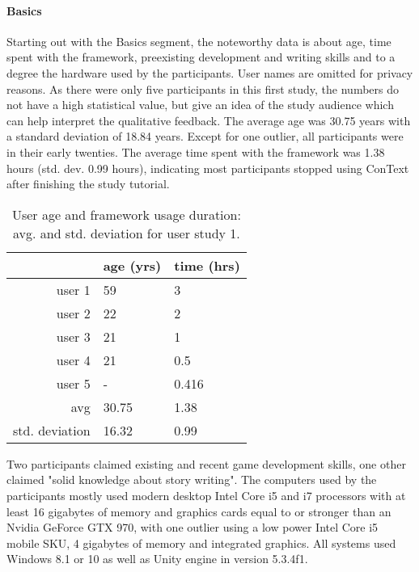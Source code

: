 \paragraph{Basics} 
Starting out with the Basics segment, the noteworthy data is about age, time spent with the framework, preexisting development and writing skills and to a degree the hardware used by the participants. User names are omitted for privacy reasons. 
As there were only five participants in this first study, the numbers do not have a high statistical value, but give an idea of the study audience which can help interpret the qualitative feedback. The average age was 30.75 years with a standard deviation of 18.84 years. Except for one outlier, all participants were in their early twenties. The average time spent with the framework was 1.38 hours (std. dev. 0.99 hours), indicating most participants stopped using ConText after finishing the study tutorial.
\begin{table}[htpb]
  \centering
  \begin{tabular}{r|l l}
       & \textbf{age} (yrs) & \textbf{time} (hrs) \\
    \midrule
      user 1 & 59 & 3 \\
      user 2 & 22 & 2 \\
      user 3 & 21 & 1 \\
      user 4 & 21 & 0.5 \\
      user 5 & - & 0.416 \\
      avg & 30.75 & 1.38 \\
      std. deviation & 16.32 & 0.99 \\
    \bottomrule
  \end{tabular}
  \caption[User study \#{}1 user age/time spent]{User age and framework usage duration: avg. and std. deviation for user study 1.}\label{tab:u1_age}
\end{table}
Two participants claimed existing and recent game development skills, one other claimed "solid knowledge about story writing".
The computers used by the participants mostly used modern desktop Intel Core i5 and i7 processors with at least 16 gigabytes of memory and graphics cards equal to or stronger than an Nvidia GeForce GTX 970, with one outlier using a low power Intel Core i5 mobile SKU, 4 gigabytes of memory and integrated graphics. All systems used Windows 8.1 or 10 as well as Unity engine in version 5.3.4f1.
